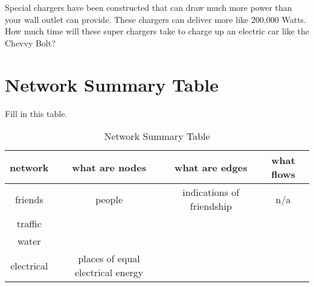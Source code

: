 \begin{blevel}
Special chargers have been constructed that can draw much more power than your wall outlet can provide. These chargers can deliver more like 200,000 Watts. How much time will these super chargers take to charge up an electric car like the Chevvy Bolt?
\end{blevel}


\section{Network Summary Table}

\begin{blevel}
Fill in this table.
\end{blevel}

\par
\begin{table}[H]
\begin{center}
\begin{tabular}{ |c | c | c | c |} \hline
network	&	what are nodes	& what are edges	& what flows \\ \hline
friends	&	people	& indications of friendship	& n/a \\ \hline
traffic &		&				&	\\ \hline
water	&		&				&	\\ \hline
electrical	& places of equal electrical energy	&	&	\\ \hline
\end{tabular}
\caption{Network Summary Table}
\end{center}
\end{table}


